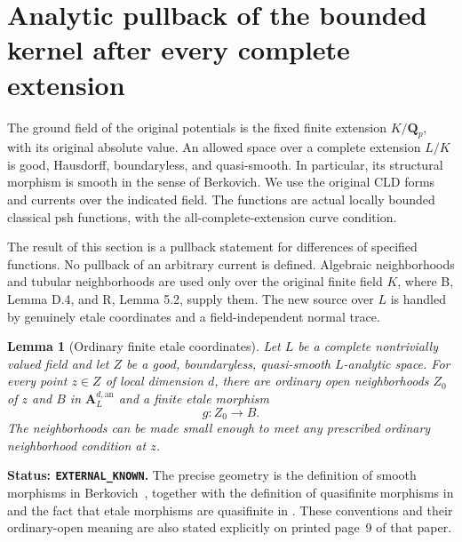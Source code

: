 \documentclass[11pt,a4paper]{article}
\numberwithin{equation}{section}
\newtheorem{lemma}[theorem]{Lemma}
\theoremstyle{definition}
\theoremstyle{remark}
\begin{document}


\section{Analytic pullback of the bounded kernel after every complete extension}
\label{sec:r5-extension-analytic-kernel}

The ground field of the original potentials is the fixed finite extension
$K/\mathbf Q_p$, with its original absolute value.  An allowed space over a
complete extension $L/K$ is good, Hausdorff, boundaryless, and quasi-smooth.
In particular, its structural morphism is smooth in the sense of
Berkovich.  We use the original CLD forms and currents over the indicated
field.  The functions are actual locally bounded classical psh functions,
with the all-complete-extension curve condition.

The result of this section is a pullback statement for differences of
specified functions.  No pullback of an arbitrary current is defined.
Algebraic neighborhoods and tubular neighborhoods are used only over the
original finite field $K$, where B, Lemma D.4, and R, Lemma 5.2, supply
them.  The new source over $L$ is handled by genuinely etale coordinates
and a field-independent normal trace.

\begin{lemma}[Ordinary finite etale coordinates]
\label{lem:r5-ordinary-finite-etale-coordinates}
Let $L$ be a complete nontrivially valued field and let $Z$ be a good,
boundaryless, quasi-smooth $L$-analytic space.  For every point $z\in Z$
of local dimension $d$, there are ordinary open neighborhoods $Z_0$ of
$z$ and $B$ in $\mathbf A_L^{d,\mathrm{an}}$ and a finite etale
morphism
\[
                         g:Z_0\longrightarrow B.
\]
The neighborhoods can be made small enough to meet any prescribed
ordinary neighborhood condition at $z$.
\end{lemma}

\noindent\textbf{Status: \texttt{EXTERNAL\_KNOWN}.}
The precise geometry is the definition of smooth morphisms in
Berkovich~\cite[\S3.5]{Ber93}, together with the definition of
quasifinite morphisms in \cite[Definition~3.1.1 and Lemma~3.1.2]{Ber93}
and the fact that etale morphisms are quasifinite in
\cite[3.3.4]{Ber93}.  These conventions and
their ordinary-open meaning are also stated explicitly on printed
page~9 of that paper.
\end{document}
